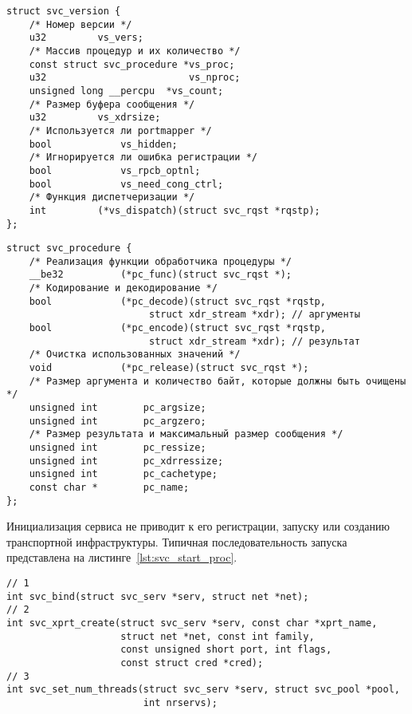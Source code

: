 \clearpage

\begin{lstlisting}[caption={Структура версии}, label={lst:struct_svc_version}]
struct svc_version {
    /* Номер версии */
    u32         vs_vers;
    /* Массив процедур и их количество */
    const struct svc_procedure *vs_proc;
    u32                         vs_nproc;
    unsigned long __percpu  *vs_count;
    /* Размер буфера сообщения */
    u32         vs_xdrsize;
    /* Используется ли portmapper */
    bool            vs_hidden;
    /* Игнорируется ли ошибка регистрации */
    bool            vs_rpcb_optnl;
    bool            vs_need_cong_ctrl;
    /* Функция диспетчеризации */
    int         (*vs_dispatch)(struct svc_rqst *rqstp);
};
\end{lstlisting}

\begin{lstlisting}[caption={Структура процедуры}, label={lst:struct_svc_procedure}]
struct svc_procedure {
    /* Реализация функции обработчика процедуры */
    __be32          (*pc_func)(struct svc_rqst *);
    /* Кодирование и декодирование */
    bool            (*pc_decode)(struct svc_rqst *rqstp,
                         struct xdr_stream *xdr); // аргументы
    bool            (*pc_encode)(struct svc_rqst *rqstp,
                         struct xdr_stream *xdr); // результат
    /* Очистка использованных значений */
    void            (*pc_release)(struct svc_rqst *);
    /* Размер аргумента и количество байт, которые должны быть очищены */
    unsigned int        pc_argsize;
    unsigned int        pc_argzero;
    /* Размер результата и максимальный размер сообщения */
    unsigned int        pc_ressize;
    unsigned int        pc_xdrressize;
    unsigned int        pc_cachetype;
    const char *        pc_name;
};
\end{lstlisting}

Инициализация сервиса не приводит к его регистрации, запуску или созданию
транспортной инфраструктуры. Типичная последовательность запуска представлена
на листинге~\ref{lst:svc_start_proc}.

\clearpage

\begin{lstlisting}[caption={Последовательность регистрации и запуска сервиса}, label={lst:svc_start_proc}]
// 1
int svc_bind(struct svc_serv *serv, struct net *net);
// 2
int svc_xprt_create(struct svc_serv *serv, const char *xprt_name,
                    struct net *net, const int family,
                    const unsigned short port, int flags,
                    const struct cred *cred);
// 3
int svc_set_num_threads(struct svc_serv *serv, struct svc_pool *pool,
                        int nrservs);
\end{lstlisting}

